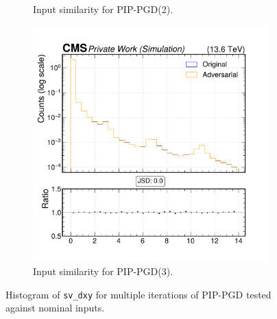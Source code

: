 \begin{figure}[h]
\begin{subfigure}[t]{0.32\textwidth}
    \caption*{Input similarity for PIP-PGD(2).}
  \end{subfigure}\hfill
  \begin{subfigure}[t]{0.32\textwidth}
    \includegraphics[width=\linewidth]{media/output/features/compare/combined_it_3/cmp_vtx_arr_sv_dxy.pdf}
    \caption*{Input similarity for PIP-PGD(3).}
  \end{subfigure}

  \caption*{Histogram of \texttt{sv\_dxy} for multiple iterations of PIP-PGD tested against nominal inputs.}
  \label{fig:combined_input_sv_dxy}
\end{figure}

